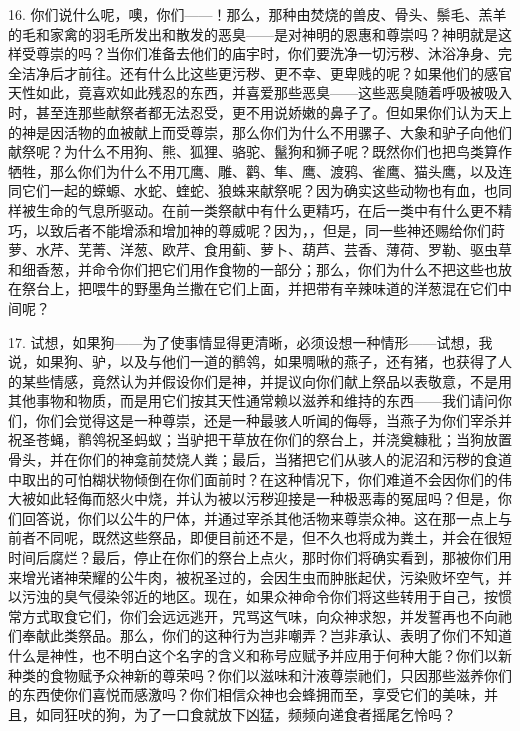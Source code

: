 16. 你们说什么呢，噢，你们——！那么，那种由焚烧的兽皮、骨头、鬃毛、羔羊的毛和家禽的羽毛所发出和散发的恶臭——是对神明的恩惠和尊崇吗？神明就是这样受尊崇的吗？当你们准备去他们的庙宇时，你们要洗净一切污秽、沐浴净身、完全洁净后才前往。还有什么比这些更污秽、更不幸、更卑贱的呢？如果他们的感官天性如此，竟喜欢如此残忍的东西，并喜爱那些恶臭——这些恶臭随着呼吸被吸入时，甚至连那些献祭者都无法忍受，更不用说娇嫩的鼻子了。但如果你们认为天上的神是因活物的血被献上而受尊崇，那么你们为什么不用骡子、大象和驴子向他们献祭呢？为什么不用狗、熊、狐狸、骆驼、鬣狗和狮子呢？既然你们也把鸟类算作牺牲，那么你们为什么不用兀鹰、雕、鹳、隼、鹰、渡鸦、雀鹰、猫头鹰，以及连同它们一起的蝾螈、水蛇、蝰蛇、狼蛛来献祭呢？因为确实这些动物也有血，也同样被生命的气息所驱动。在前一类祭献中有什么更精巧，在后一类中有什么更不精巧，以致后者不能增添和增加神的尊威呢？因为，，但是，同一些神还赐给你们莳萝、水芹、芜菁、洋葱、欧芹、食用蓟、萝卜、葫芦、芸香、薄荷、罗勒、驱虫草和细香葱，并命令你们把它们用作食物的一部分；那么，你们为什么不把这些也放在祭台上，把喂牛的野墨角兰撒在它们上面，并把带有辛辣味道的洋葱混在它们中间呢？\par

17. 试想，如果狗——为了使事情显得更清晰，必须设想一种情形——试想，我说，如果狗、驴，以及与他们一道的鹡鸰，如果啁啾的燕子，还有猪，也获得了人的某些情感，竟然认为并假设你们是神，并提议向你们献上祭品以表敬意，不是用其他事物和物质，而是用它们按其天性通常赖以滋养和维持的东西——我们请问你们，你们会觉得这是一种尊崇，还是一种最骇人听闻的侮辱，当燕子为你们宰杀并祝圣苍蝇，鹡鸰祝圣蚂蚁；当驴把干草放在你们的祭台上，并浇奠糠秕；当狗放置骨头，并在你们的神龛前焚烧人粪；最后，当猪把它们从骇人的泥沼和污秽的食道中取出的可怕糊状物倾倒在你们面前时？在这种情况下，你们难道不会因你们的伟大被如此轻侮而怒火中烧，并认为被以污秽迎接是一种极恶毒的冤屈吗？但是，你们回答说，你们以公牛的尸体，并通过宰杀其他活物来尊崇众神。这在那一点上与前者不同呢，既然这些祭品，即便目前还不是，但不久也将成为粪土，并会在很短时间后腐烂？最后，停止在你们的祭台上点火，那时你们将确实看到，那被你们用来增光诸神荣耀的公牛肉，被祝圣过的，会因生虫而肿胀起伏，污染败坏空气，并以污浊的臭气侵染邻近的地区。现在，如果众神命令你们将这些转用于自己，按惯常方式取食它们，你们会远远逃开，咒骂这气味，向众神求恕，并发誓再也不向祂们奉献此类祭品。那么，你们的这种行为岂非嘲弄？岂非承认、表明了你们不知道什么是神性，也不明白这个名字的含义和称号应赋予并应用于何种大能？你们以新种类的食物赋予众神新的尊荣吗？你们以滋味和汁液尊崇祂们，只因那些滋养你们的东西使你们喜悦而感激吗？你们相信众神也会蜂拥而至，享受它们的美味，并且，如同狂吠的狗，为了一口食就放下凶猛，频频向递食者摇尾乞怜吗？\par

